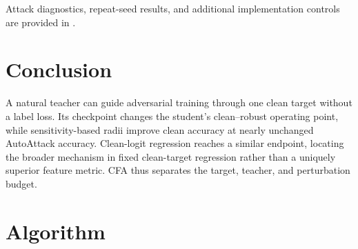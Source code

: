 \documentclass{article} %
\theoremstyle{plain}
\begin{document}
Attack diagnostics, repeat-seed results, and additional implementation
controls are provided in .

\section{Conclusion}
\label{sec:conclusion}

A natural teacher can guide adversarial training through one clean target without a label loss.
Its checkpoint changes the student's clean--robust operating point, while sensitivity-based radii
improve clean accuracy at nearly unchanged AutoAttack accuracy. Clean-logit regression reaches a
similar endpoint, locating the broader mechanism in fixed clean-target regression rather than a
uniquely superior feature metric. CFA thus separates the target, teacher, and perturbation budget.

\clearpage
\appendix

\section{Algorithm}
\label{app:alg}
\end{document}
